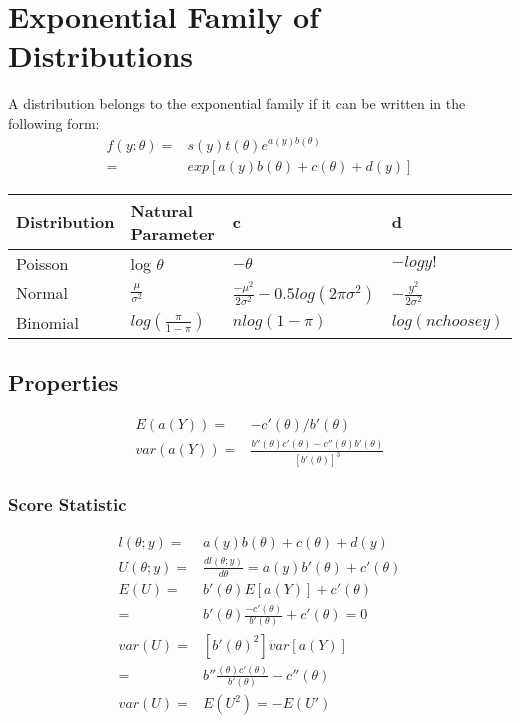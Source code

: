 \documentclass[11pt]{article}
\begin{document}
\section{Exponential Family of Distributions}
\label{sec:org2b73379}
A distribution belongs to the exponential family if it can be written in the
following form:
\begin{equation}
\begin{split}
f(y : \theta) = & s(y) t(\theta) e^{a(y) b(\theta)}\\
= & exp[a(y) b(\theta) + c(\theta) + d(y)]
\end{split}
\end{equation}

\begin{center}
\begin{tabular}{llll}
Distribution & Natural Parameter & c & d\\
\hline
Poisson & log \(\theta\) & \(- \theta\) & \(- log y!\)\\
Normal & \(\frac{\mu}{\sigma^2}\) & \(\frac{- \mu^2}{2 \sigma^2} - 0.5 log (2 \pi \sigma^2)\) & \(- \frac{y^2}{2 \sigma^2}\)\\
Binomial & \(log(\frac{\pi}{1 - \pi})\) & \(n log (1 - \pi)\) & \(log (n choose y)\)\\
\end{tabular}
\end{center}


\subsection{Properties}
\label{sec:orgf34979b}
\begin{equation}
\begin{split}
E(a(Y)) = & - c'(\theta) / b' (\theta)\\
var(a(Y)) = & \frac{b'' (\theta) c' (\theta) - c''(\theta) b' (\theta)}{[b' (\theta)]^3}
\end{split}
\end{equation}

\subsubsection{Score Statistic}
\label{sec:orga28ea07}
\begin{equation}
\begin{split}
l(\theta; y) = & a(y) b(\theta) + c(\theta) + d(y)\\
U(\theta; y) = & \frac{dl(\theta; y)}{d \theta} = a(y) b' (\theta) + c' (\theta)\\
E(U) = & b' (\theta) E[a(Y)] + c' (\theta)\\
= & b' (\theta) \frac{- c' (\theta)}{b' (\theta)} + c' (\theta) = 0\\
var(U) = & [b' (\theta)^2] var[ a(Y)]\\
= & b'' \frac{(\theta) c' (\theta)}{b' (\theta)} - c'' (\theta)\\
var(U) = & E(U^2) = - E(U')
\end{split}
\end{equation}
\end{document}
